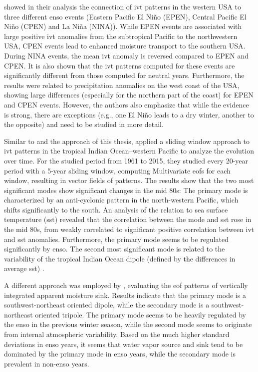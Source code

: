 \citeauthor{kim_ensos_2015} showed in their analysis the connection of \ac{ivt} patterns in the western USA to three different \ac{enso} events (Eastern Pacific El Niño (EPEN), Central Pacific El Niño (CPEN) and La Niña (NINA)). 
While EPEN events are associated with large positive \ac{ivt} anomalies from the subtropical Pacific to the northwestern USA, CPEN events lead to enhanced moisture transport to the southern USA. 
During NINA events, the mean \ac{ivt} anomaly is reversed compared to EPEN and CPEN. 
It is also shown that the \ac{ivt} patterns computed for these events are significantly different from those computed for neutral years.
Furthermore, the results were related to precipitation anomalies on the west coast of the USA, showing large differences (especially for the northern part of the coast) for EPEN and CPEN events. 
However, the authors also emphasize that while the evidence is strong, there are exceptions (e.g., one El Niño leads to a dry winter, another to the opposite) and need to be studied in more detail. \cite{kim_ensos_2015}

Similar to \cite{vietinghoff_visual_2021} and the approach of this thesis, \citeauthor{zou_interdecadal_2018} applied a sliding window approach to \ac{ivt} patterns in the tropical Indian Ocean–western Pacific to analyze the evolution over time. 
For the studied period from 1961 to 2015, they studied every 20-year period with a 5-year sliding window, computing Multivariate \acp{eof} for each window, resulting in vector fields of patterns. 
The results show that the two most significant modes show significant changes in the mid 80s: The primary mode is characterized by an anti-cyclonic pattern in the north-western Pacific, which shifts significantly to the south. 
An analysis of the relation to sea surface temperature (\ac{sst}) revealed that the correlation between the mode and \ac{sst} rose in the mid 80s, from weakly correlated to significant positive correlation between \ac{ivt} and \ac{sst} anomalies. 
Furthermore, the primary mode seems to be regulated significantly by \ac{enso}. 
The second most significant mode is related to the variability of the tropical Indian Ocean dipole (defined by the differences in average \ac{sst}) \cite{zou_interdecadal_2018}.

A different approach was employed by \cite{zou_investigating_2020}, evaluating the \ac{eof} patterns of vertically integrated apparent moisture sink. 
Results indicate that the primary mode is a southwest-northeast oriented dipole, while the secondary mode is a southwest-northeast oriented tripole. 
The primary mode seems to be heavily regulated by the \ac{enso} in the previous winter season, while the second mode seems to originate from internal atmospheric variability. 
Based on the much higher standard deviations in \ac{enso} years, it seems that water vapor source and sink tend to be dominated by the primary mode in \ac{enso} years, while the secondary mode is prevalent in non-\ac{enso} years. 


